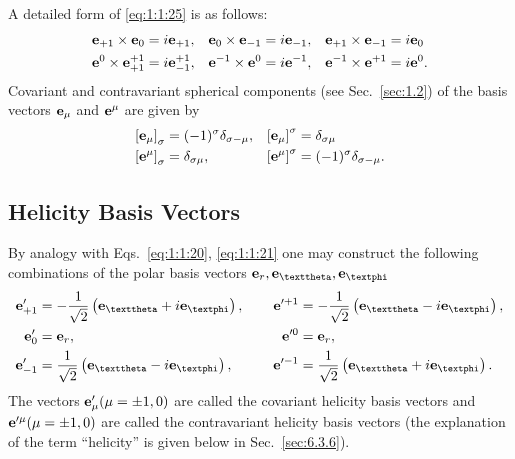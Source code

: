 A detailed form of \eqref{eq:1:1:25} is as follows:
\begin{equation}
\begin{aligned}
&\mathbf{e}_{+1} \times \mathbf{e}_{0}=i \mathbf{e}_{+1}, && \mathbf{e}_{0} \times \mathbf{e}_{-1}=i \mathbf{e}_{-1}, && \mathbf{e}_{+1} \times \mathbf{e}_{-1}=i \mathbf{e}_{0}\\
&\mathbf{e}^{0} \times \mathbf{e}_{+1}^{+1}=i \mathbf{e}_{-1}^{+1},&& \mathbf{e}^{-1} \times \mathbf{e}^{0}=i \mathbf{e}^{-1},&&\mathbf{e}^{-1} \times \mathbf{e}^{+1}=i \mathbf{e}^{0}.
\end{aligned}
  \label{eq:1:1:26}
\end{equation}
Covariant and contravariant spherical components (see Sec.~\ref{sec:1.2}) of the basis vectors \(\mathbf{e}_{\mu}\) and \(\mathbf{e}^{\mu}\) are given by
\begin{equation}
\begin{aligned}
&{\left[\mathbf{e}_{\mu}\right]_{\sigma}=(-1)^{\sigma} \delta_{\sigma-\mu},} && {\left[\mathbf{e}_{\mu}\right]^{\sigma}=\delta_{\sigma \mu}} \\
&{\left[\mathbf{e}^{\mu}\right]_{\sigma}=\delta_{\sigma \mu},} && {\left[\mathbf{e}^{\mu}\right]^{\sigma}=(-1)^{\sigma} \delta_{\sigma-\mu}}. \label{eq:1:1:27}
\end{aligned}
\end{equation}
\subsection{Helicity Basis Vectors}\label{sec:1.1.4}
By analogy with Eqs.~\eqref{eq:1:1:20}, \eqref{eq:1:1:21} one may construct the following combinations of the polar basis vectors \(\vect{e}_{r}, \vect{e}_{\vartheta}, \vect{e}_{\varphi}\)
\begin{alignat}{2}
\vect{e}_{+1}^{\prime} & =-\frac{1}{\sqrt{2}}\left(\vect{e}_{\vartheta}+i \vect{e}_{\varphi}\right), & \vect{e}^{\prime+1} & =-\frac{1}{\sqrt{2}}\left(\vect{e}_{\vartheta}-i \vect{e}_{\varphi}\right),  \notag\\
\vect{e}_{0}^{\prime} & =\vect{e}_{r}, & \vect{e}^{\prime 0} & =\vect{e}_{r},  \label{eq:1:1:28}\\
\vect{e}_{-1}^{\prime} & =\frac{1}{\sqrt{2}}\left(\vect{e}_{\vartheta}-i \vect{e}_{\varphi}\right),\qquad & \vect{e}^{\prime-1} & =\frac{1}{\sqrt{2}}\left(\vect{e}_{\vartheta}+i \vect{e}_{\varphi}\right) . \notag
\end{alignat}
The vectors \(\mathbf{e}_{\mu}^{\prime}(\mu= \pm 1,0)\) are called the covariant helicity basis vectors and \(\mathbf{e}^{\prime \mu}(\mu= \pm 1,0)\) are called the contravariant helicity basis vectors (the explanation of the term ``helicity'' is given below in Sec.~\ref{sec:6.3.6}).

